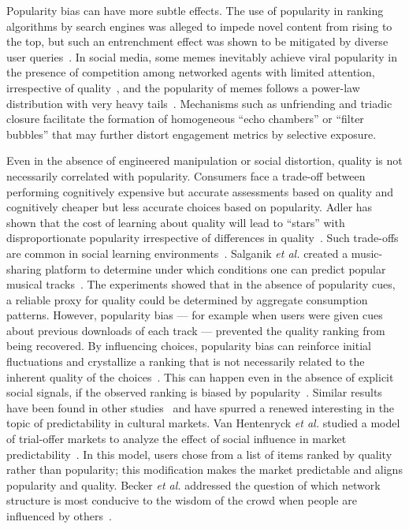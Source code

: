 Popularity bias can have more subtle effects. The use of popularity in ranking algorithms by search engines was alleged to impede novel content from rising to the top, but such an entrenchment effect was shown to be mitigated by diverse user queries~\cite{Fortunato22082006}. In social media, some memes inevitably achieve viral popularity in the presence of competition among networked agents with limited attention, irrespective of quality~\citep{Weng2012}, and the popularity of memes follows a power-law distribution with very heavy tails~\citep{refgleeson}. Mechanisms such as unfriending and triadic closure facilitate the formation of homogeneous ``echo chambers'' \cite{Sunstein1} or ``filter bubbles'' \cite{Pariser} that may further distort engagement metrics by selective exposure. 

Even in the absence of engineered manipulation or social distortion, quality is not necessarily correlated with popularity. Consumers face a trade-off between performing cognitively expensive but accurate assessments based on quality and cognitively cheaper but less accurate choices based on popularity. 
Adler %
has shown that the cost of learning about quality will lead to ``stars'' with disproportionate popularity irrespective of differences in quality~\cite{Adler85}. Such trade-offs are common in social learning environments~\cite{Rendell208}.  
Salganik \textit{et al.} %
created a music-sharing platform to determine under which conditions one can predict popular musical tracks~\cite{salganik2006experimental}. The experiments showed that in the absence of popularity cues, a reliable proxy for quality could be determined by aggregate consumption patterns. However, popularity bias --- for example when users were given cues about previous downloads of each track --- prevented the quality ranking from being recovered. 
By influencing choices, popularity bias can reinforce initial fluctuations and crystallize a ranking that is not necessarily related to the inherent quality of the choices~\cite{hogg2015disentangling}.
%
This can happen even in the absence of explicit social signals, if the observed ranking is biased by popularity~\cite{hodas2012limited}. 
%
Similar results have been found in other studies~\cite{salganik2008leading,salganik2009web,krumme2012quantifying,gilbert2013widespread} and have spurred a renewed interesting in the topic of predictability in cultural markets. 
Van Hentenryck \textit{et al.} %
studied a model of trial-offer markets to analyze the effect of social influence in market predictability~\cite{van2016aligning}. In this model, users chose from a list of items ranked by quality rather than popularity; this modification makes the market predictable and aligns popularity and quality.
Becker \textit{et al.} addressed the question of which network structure is most conducive to the wisdom of the crowd when people are influenced by others~\cite{becker2017network}.

